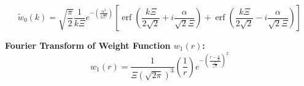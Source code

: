 \documentclass[letterpaper,twocolumn,amsmath,amssymb,prb]{revtex4-1}
\begin{document}
\begin{widetext}
\begin{equation}{\widetilde{w}_0(k)=\sqrt{\frac{\pi}{2}}\frac{1}{k\Xi}e^{-\left(\frac{\alpha^2}{2\Xi^2}\right)}\left[\operatorname{erf}\left(\frac{k\Xi}{2\sqrt{2}}+i\frac{\alpha}{\sqrt{2}\Xi}\right)+\operatorname{erf}\left(\frac{k\Xi}{2\sqrt{2}}-i\frac{\alpha}{\sqrt{2}\Xi}\right)\right]}\end{equation}
\color{black}

\noindent\textbf{Fourier Transform of Weight Function $w_1(r)$:}
\begin{equation}{w_1(r)=\frac{1}{\Xi(\sqrt{2\pi})^3}\left(\frac{1}{r}\right)e^{-\left(\frac{r-\frac{\alpha}{2}}{\frac{\Xi}{\sqrt{2}}}\right)^2}}\end{equation}


\end{widetext}
\end{document}
